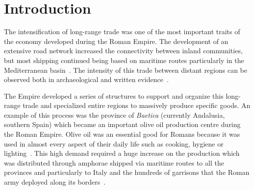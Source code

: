 \documentclass[review]{elsarticle}
\begin{document}
\section{Introduction}

The intensification of long-range trade was one of the most important traits of the economy developed during the Roman Empire. The development of an extensive road network increased the connectivity between inland communities, but most shipping continued being based on maritime routes particularly in the Mediterranean basin~\citep{temin_market_2001,bevan_mediterranean_2014}. The intensity of this trade between distant regions can be observed both in archaeological and written evidence~\citep{rodriguez_baetican_1998}.


The Empire developed a series of structures to support and organize this long-range trade and specialized entire regions to massively produce specific goods. An example of this process was the province of \textit{Baetica} (currently Andalusia, southern Spain) which became an important olive oil production centre during the Roman Empire. Olive oil was an essential good for Romans because it was used in almost every aspect of their daily life such as cooking, hygiene or lighting~\citep{mattingly_d.j._oil_1988}. This high demand required a huge increase on the production which was distributed through amphorae shipped via maritime routes to all the provinces and particularly to Italy and the hundreds of garrisons that the Roman army deployed along its borders~\citep{blazquez_exportacion_1980}. 
\end{document}
